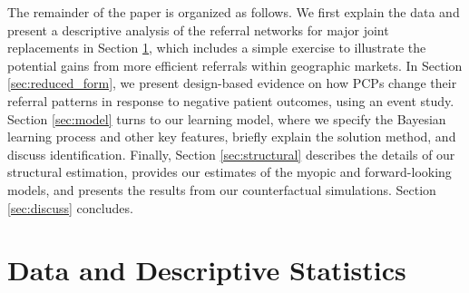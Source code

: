 \documentclass[12pt]{article}
\begin{document}
The remainder of the paper is organized as follows. We first explain the data and present a descriptive analysis of the referral networks for major joint replacements in Section \ref{sec:data}, which includes a simple exercise to illustrate the potential gains from more efficient referrals within geographic markets. In Section \ref{sec:reduced_form}, we present design-based evidence on how PCPs change their referral patterns in response to negative patient outcomes, using an event study. Section \ref{sec:model} turns to our learning model, where we specify the Bayesian learning process and other key features, briefly explain the solution method, and discuss identification. Finally, Section \ref{sec:structural} describes the details of our structural estimation, provides our estimates of the myopic and forward-looking models, and presents the results from our counterfactual simulations. Section \ref{sec:discuss} concludes.



\section{Data and Descriptive Statistics}
\label{sec:data}
\end{document}
